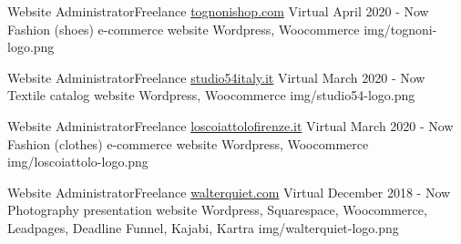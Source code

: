 
\begin{cventries}

  \logocventry
    {Website Administrator{\enskip\cdotp\enskip}Freelance}
    {\href{https://www.tognonishop.com}{tognonishop.com}}
    {Virtual}
    {April 2020 - Now}
    {
      \cvexp
        {Fashion (shoes) e-commerce website}
        {}
        {Wordpress, Woocommerce}
    }
    {img/tognoni-logo.png}

  \logocventry
    {Website Administrator{\enskip\cdotp\enskip}Freelance}
    {\href{https://www.studio54italy.it}{studio54italy.it}}
    {Virtual}
    {March 2020 - Now}
    {
      \cvexp
        {Textile catalog website}
        {}
        {Wordpress, Woocommerce}
    }
    {img/studio54-logo.png}

  \logocventry
    {Website Administrator{\enskip\cdotp\enskip}Freelance}
    {\href{https://www.loscoiattolofirenze.it}{loscoiattolofirenze.it}}
    {Virtual}
    {March 2020 - Now}
    {
      \cvexp
        {Fashion (clothes) e-commerce website}
        {}
        {Wordpress, Woocommerce}
    }
    {img/loscoiattolo-logo.png}

  \logocventry
    {Website Administrator{\enskip\cdotp\enskip}Freelance}
    {\href{https://www.walterquiet.com}{walterquiet.com}}
    {Virtual}
    {December 2018 - Now}
    {
      \cvexp
        {Photography presentation website}
        {}
        {Wordpress, Squarespace, Woocommerce, Leadpages, Deadline Funnel, Kajabi, Kartra}
    }
    {img/walterquiet-logo.png}

\end{cventries}

